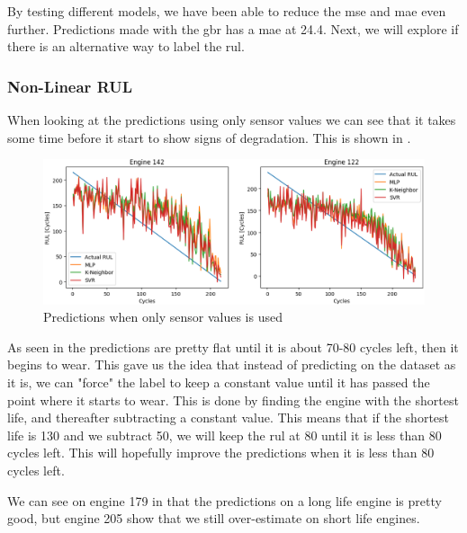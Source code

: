 \documentclass[english, a4paper]{report}
\begin{document}
{{{{                By testing different models, we have been able to reduce the \gls{mse} and \gls{mae} even further. Predictions made with the \gls{gbr} has a \gls{mae} at 24.4. Next, we will explore if there is an alternative way to label the \gls{rul}.
            }
                
            \subsubsection{Non-Linear RUL}
            {
                When looking at the predictions using only sensor values we can see that it takes some time before it start to show signs of degradation. This is shown in .
                
                \begin{figure}[H]
                    \centering \includegraphics[width=1\linewidth]{kviforrelable}
                    \caption{Predictions when only sensor values is used}
                    \label{fig:whyReLable}
                \end{figure}
                
                As seen in  the predictions are pretty flat until it is about 70-80 cycles left, then it begins to wear. This gave us the idea that instead of predicting on the dataset as it is, we can "force" the label to keep a constant value until it has passed the point where it starts to wear. This is done by finding the engine with the shortest life, and thereafter subtracting a constant value. This means that if the shortest life is 130 and we subtract 50, we will keep the \gls{rul} at 80 until it is less than 80 cycles left. This will hopefully improve the predictions when it is less than 80 cycles left. 
                \par
                We can see on engine 179 in  that the predictions on a long life engine is pretty good, but engine 205 show that we still over-estimate on short life engines.
                
}}}}
\end{document}
